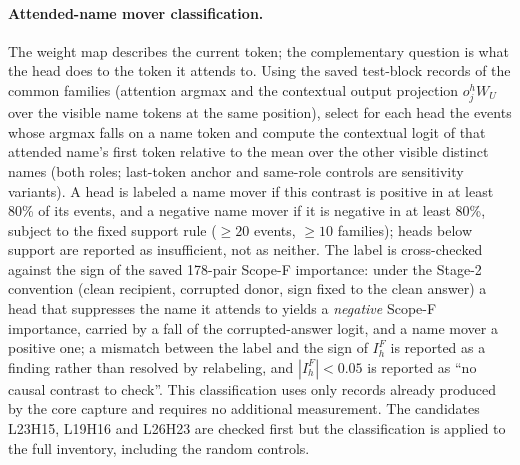 
\paragraph{Attended-name mover classification.}
The weight map describes the current token; the complementary question is what the head
does to the token it attends to. Using the saved test-block records of the common
families (attention argmax and the contextual output projection $o^h_j W_U$ over the
visible name tokens at the same position), select for each head the events whose argmax
falls on a name token and compute the contextual logit of that attended name's first
token relative to the mean over the other visible distinct names (both roles; last-token
anchor and same-role controls are sensitivity variants). A head is labeled a name mover
if this contrast is positive in at least 80\% of its events, and a negative name mover if
it is negative in at least 80\%, subject to the fixed support rule ($\geq 20$ events,
$\geq 10$ families); heads below support are reported as insufficient, not as neither.
The label is cross-checked against the sign of the saved 178-pair Scope-F importance:
under the Stage-2 convention (clean recipient, corrupted donor, sign fixed to the clean
answer) a head that suppresses the name it attends to yields a \emph{negative} Scope-F
importance, carried by a fall of the corrupted-answer logit, and a name mover a positive
one; a mismatch between the label and the sign of $I^F_h$ is reported as a finding rather
than resolved by relabeling, and $|I^F_h|<0.05$ is reported as ``no causal contrast to
check''. This classification uses only records already produced by the core capture and
requires no additional measurement. The candidates L23H15, L19H16 and L26H23 are checked
first but the classification is applied to the full inventory, including the random
controls.
